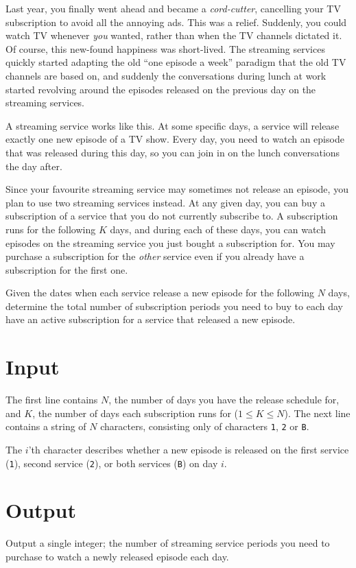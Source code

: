 
Last year, you finally went ahead and became a \emph{cord-cutter}, cancelling your TV subscription to avoid all the annoying ads.
This was a relief.
Suddenly, you could watch TV whenever \emph{you} wanted, rather than when the TV channels dictated it.
Of course, this new-found happiness was short-lived.
The streaming services quickly started adapting the old ``one episode a week'' paradigm that the old TV channels are based on, and suddenly the conversations during lunch at work started revolving around the episodes released on the previous day on the streaming services.

A streaming service works like this.
At some specific days, a service will release exactly one new episode of a TV show.
Every day, you need to watch an episode that was released during this day, so you can join in on the lunch conversations the day after.

Since your favourite streaming service may sometimes not release an episode, you plan to use two streaming services instead.
At any given day, you can buy a subscription of a service that you do not currently subscribe to.
A subscription runs for the following $K$ days, and during each of these days, you can watch episodes on the streaming service you just bought a subscription for.
You may purchase a subscription for the \emph{other} service even if you already have a subscription for the first one.
 
Given the dates when each service release a new episode for the following $N$ days, determine the total number of subscription periods you need to buy to each day have an active subscription for a service that released a new episode.

\section*{Input}
The first line contains $N$, the number of days you have the release schedule for, and $K$, the number of days each subscription runs for ($1 \le K \le N$).
The next line contains a string of $N$ characters, consisting only of characters \texttt{1}, \texttt{2} or \texttt{B}.

The $i$'th character describes whether a new episode is released on the first service (\texttt{1}), second service (\texttt{2}), or both services (\texttt{B}) on day $i$.

\section*{Output}
Output a single integer; the number of streaming service periods you need to purchase to watch a newly released episode each day.

